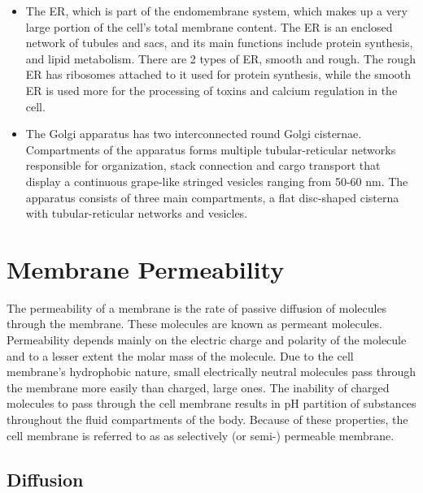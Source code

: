\begin{itemize}
\item
  The ER, which is part of the endomembrane system, which makes up a very large portion of the cell's total membrane content. The ER is an enclosed network of tubules and sacs, and its main functions include protein synthesis, and lipid metabolism. There are 2 types of ER, smooth and rough. The rough ER has ribosomes attached to it used for protein synthesis, while the smooth ER is used more for the processing of toxins and calcium regulation in the cell.
\item
  The Golgi apparatus has two interconnected round Golgi cisternae. Compartments of the apparatus forms multiple tubular-reticular networks responsible for organization, stack connection and cargo transport that display a continuous grape-like stringed vesicles ranging from 50-60 nm. The apparatus consists of three main compartments, a flat disc-shaped cisterna with tubular-reticular networks and vesicles.
\end{itemize}

\hypertarget{membrane-permeability}{%
\section{Membrane Permeability}\label{membrane-permeability}}

The permeability of a membrane is the rate of passive diffusion of molecules through the membrane. These molecules are known as permeant molecules. Permeability depends mainly on the electric charge and polarity of the molecule and to a lesser extent the molar mass of the molecule. Due to the cell membrane's hydrophobic nature, small electrically neutral molecules pass through the membrane more easily than charged, large ones. The inability of charged molecules to pass through the cell membrane results in pH partition of substances throughout the fluid compartments of the body. Because of these properties, the cell membrane is referred to as as selectively (or semi-) permeable membrane.

\hypertarget{diffusion}{%
\subsection{Diffusion}\label{diffusion}}

